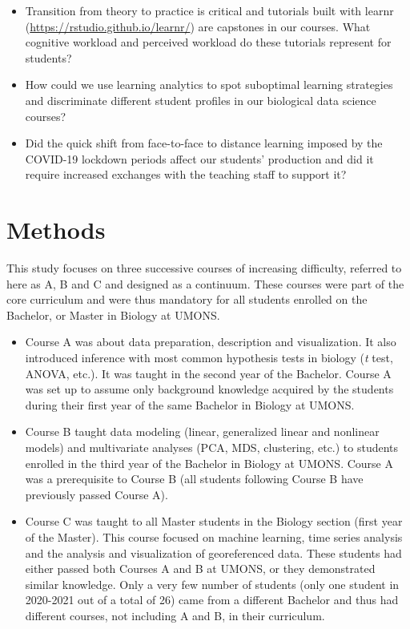 \documentclass{aims} %
\theoremstyle{definition}
\begin{document}
\begin{itemize}
\item
  Transition from theory to practice is critical and tutorials built
  with learnr (\url{https://rstudio.github.io/learnr/}) are capstones in
  our courses. What cognitive workload and perceived workload do these
  tutorials represent for students?
\item
  How could we use learning analytics to spot suboptimal learning
  strategies and discriminate different student profiles in our
  biological data science courses?
\item
  Did the quick shift from face-to-face to distance learning imposed by
  the COVID-19 lockdown periods affect our students' production and did
  it require increased exchanges with the teaching staff to support it?
\end{itemize}

\hypertarget{methods}{%
\section{Methods}\label{methods}}

This study focuses on three successive courses of increasing difficulty,
referred to here as A, B and C and designed as a continuum. These
courses were part of the core curriculum and were thus mandatory for all
students enrolled on the Bachelor, or Master in Biology at UMONS.

\begin{itemize}
\item
  Course A was about data preparation, description and visualization. It
  also introduced inference with most common hypothesis tests in biology
  (\emph{t} test, ANOVA, etc.). It was taught in the second year of the
  Bachelor. Course A was set up to assume only background knowledge
  acquired by the students during their first year of the same Bachelor
  in Biology at UMONS.
\item
  Course B taught data modeling (linear, generalized linear and
  nonlinear models) and multivariate analyses (PCA, MDS, clustering,
  etc.) to students enrolled in the third year of the Bachelor in
  Biology at UMONS. Course A was a prerequisite to Course B (all
  students following Course B have previously passed Course A).
\item
  Course C was taught to all Master students in the Biology section
  (first year of the Master). This course focused on machine learning,
  time series analysis and the analysis and visualization of
  georeferenced data. These students had either passed both Courses A
  and B at UMONS, or they demonstrated similar knowledge. Only a very
  few number of students (only one student in 2020-2021 out of a total
  of 26) came from a different Bachelor and thus had different courses,
  not including A and B, in their curriculum.
\end{itemize}
\end{document}
